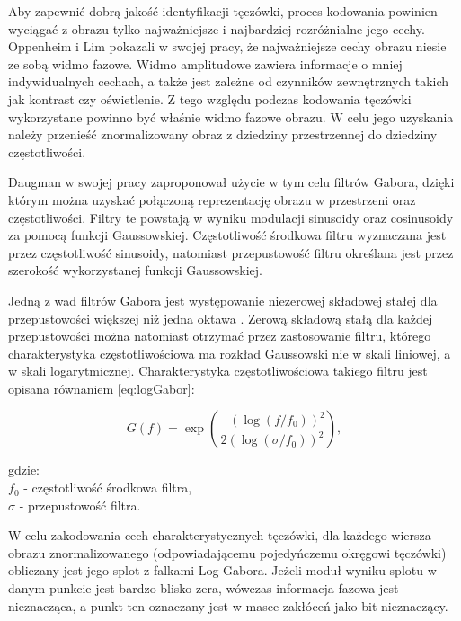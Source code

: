 Aby zapewni\'c dobrą jakoś\'c identyfikacji tęczówki, proces kodowania powinien wyciąga\'c
z obrazu tylko najważniejsze i najbardziej rozróżnialne jego cechy.
Oppenheim i Lim \cite{OppenheimLim} pokazali w swojej pracy, że najważniejsze
cechy obrazu niesie ze sobą widmo fazowe. Widmo amplitudowe zawiera
informacje o mniej indywidualnych cechach, a także jest zależne od czynników zewnętrznych takich
jak kontrast czy oświetlenie. Z tego względu podczas kodowania tęczówki wykorzystane
powinno by\'c właśnie widmo fazowe obrazu. W celu jego uzyskania należy przenieś\'c znormalizowany
obraz z dziedziny przestrzennej do dziedziny częstotliwości.\newline

Daugman \cite{DaugmanHowIrisRecognitionWorks} w swojej pracy zaproponował użycie w tym celu
filtrów Gabora, dzięki którym można uzyska\'c połączoną reprezentację obrazu w przestrzeni
oraz częstotliwości. Filtry te powstają w wyniku modulacji sinusoidy oraz cosinusoidy za pomocą
funkcji Gaussowskiej.
Częstotliwoś\'c środkowa filtru wyznaczana jest przez częstotliwoś\'c sinusoidy, natomiast
przepustowoś\'c filtru określana jest przez szerokoś\'c wykorzystanej funkcji Gaussowskiej.

Jedną z wad filtrów Gabora jest występowanie niezerowej składowej stałej dla przepustowości
większej niż jedna oktawa \cite{FieldGaborOctave}. Zerową składową stałą dla każdej przepustowości
można natomiast otrzyma\'c przez zastosowanie filtru, którego charakterystyka częstotliwościowa
ma rozkład Gaussowski nie w skali liniowej, a w skali logarytmicznej. Charakterystyka
częstotliwościowa takiego filtru jest opisana równaniem \ref{eq:logGabor}:

\begin{equation}
  \mathit{G(f)} = \exp\left(
  \frac{
    -\left( \log\left( f / f_{0}\right)\right)^{2}
  }{
    2\left(\log\left( \sigma / f_{0}\right)\right)^{2}
  }
  \right),
  \label{eq:logGabor}
\end{equation}

\noindent
gdzie:\\
\indent $f_{0}$ - częstotliwoś\'c środkowa filtra,\\
\indent $\sigma$ - przepustowoś\'c filtra.\newline

W celu zakodowania cech charakterystycznych tęczówki, dla każdego wiersza obrazu znormalizowanego (odpowiadającemu pojedyńczemu
okręgowi tęczówki) obliczany jest jego splot z falkami Log Gabora. Jeżeli moduł wyniku splotu w danym punkcie
jest bardzo blisko zera, wówczas informacja fazowa jest nieznacząca, a punkt ten oznaczany jest w
masce zakłóceń jako bit nieznaczący.

